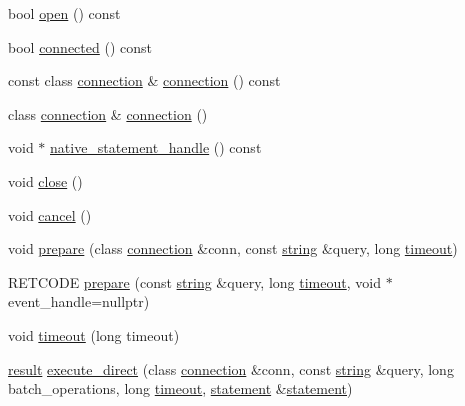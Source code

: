 \begin{DoxyCompactItemize}
bool \mbox{\hyperlink{classnanodbc_1_1statement_1_1statement__impl_a0426f3b3e85b2c1709d5d7a3b2d519e4}{open}} () const
\item 
bool \mbox{\hyperlink{classnanodbc_1_1statement_1_1statement__impl_a0a4d4c8c23f8cdcebf7a270e1cb9ff9c}{connected}} () const
\item 
const class \mbox{\hyperlink{classnanodbc_1_1connection}{connection}} \& \mbox{\hyperlink{classnanodbc_1_1statement_1_1statement__impl_ac35285c255204f794c1172b804ba6d83}{connection}} () const
\item 
class \mbox{\hyperlink{classnanodbc_1_1connection}{connection}} \& \mbox{\hyperlink{classnanodbc_1_1statement_1_1statement__impl_aecc8b1dcaa1d733e5b9565501d323c7c}{connection}} ()
\item 
void $\ast$ \mbox{\hyperlink{classnanodbc_1_1statement_1_1statement__impl_a5adfc093b2f1377bf6ecf050c3ae76b9}{native\+\_\+statement\+\_\+handle}} () const
\item 
void \mbox{\hyperlink{classnanodbc_1_1statement_1_1statement__impl_ad8e1b892f442f67a87442b7877a12e58}{close}} ()
\item 
void \mbox{\hyperlink{classnanodbc_1_1statement_1_1statement__impl_a034e1f0d9fd81769490906ade1b2ac4b}{cancel}} ()
\item 
void \mbox{\hyperlink{classnanodbc_1_1statement_1_1statement__impl_a7d93dd08169247d9c2462686b79dccd7}{prepare}} (class \mbox{\hyperlink{classnanodbc_1_1connection}{connection}} \&conn, const \mbox{\hyperlink{namespacenanodbc_abfc0ece56278e590911ec8352774c212}{string}} \&query, long \mbox{\hyperlink{classnanodbc_1_1statement_1_1statement__impl_abccb352dfb3ba5143c049017062b9dbd}{timeout}})
\item 
R\+E\+T\+C\+O\+DE \mbox{\hyperlink{classnanodbc_1_1statement_1_1statement__impl_aaacfabb5338b374f88562d9b874cc74a}{prepare}} (const \mbox{\hyperlink{namespacenanodbc_abfc0ece56278e590911ec8352774c212}{string}} \&query, long \mbox{\hyperlink{classnanodbc_1_1statement_1_1statement__impl_abccb352dfb3ba5143c049017062b9dbd}{timeout}}, void $\ast$event\+\_\+handle=nullptr)
\item 
void \mbox{\hyperlink{classnanodbc_1_1statement_1_1statement__impl_abccb352dfb3ba5143c049017062b9dbd}{timeout}} (long timeout)
\item 
\mbox{\hyperlink{classnanodbc_1_1result}{result}} \mbox{\hyperlink{classnanodbc_1_1statement_1_1statement__impl_a816b21e8b052e450e0f93f0425c58cda}{execute\+\_\+direct}} (class \mbox{\hyperlink{classnanodbc_1_1connection}{connection}} \&conn, const \mbox{\hyperlink{namespacenanodbc_abfc0ece56278e590911ec8352774c212}{string}} \&query, long batch\+\_\+operations, long \mbox{\hyperlink{classnanodbc_1_1statement_1_1statement__impl_abccb352dfb3ba5143c049017062b9dbd}{timeout}}, \mbox{\hyperlink{classnanodbc_1_1statement}{statement}} \&\mbox{\hyperlink{classnanodbc_1_1statement}{statement}})

\end{DoxyCompactItemize}
